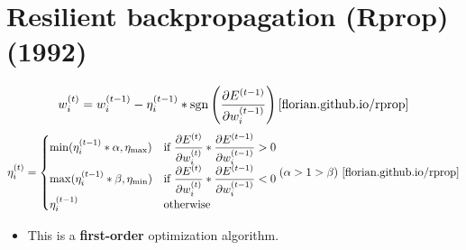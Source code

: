 \section{Resilient backpropagation (Rprop) (1992) \cite{wiki-Rprop,pytorch-Rprop,florian.github.io/rprop}}\label{Resilient backpropagation (Rprop)}

\[
    \displaystyle w_i^{(t)} = w_i^{(t - 1)} - \eta_i^{(t - 1)} * \operatorname{sgn}\left(\frac{\partial E^{(t -
    1)}}{\partial w_i^{(t - 1)}}\right)
    \hfill
    \text{\cite{florian.github.io/rprop}}
\]
\[
    \displaystyle \eta_i^{(t)} = \begin{cases}
    \min(\eta_i^{(t - 1)} * \alpha, \eta_{\max}) & \text{if } \displaystyle\frac{\partial E^{(t)}}{\partial w_i^{(t)}} * \displaystyle\frac{\partial E^{(t - 1)}}{\partial w_i^{(t - 1)}} > 0 \\
    \max(\eta_i^{(t - 1)} * \beta, \eta_{\min}) & \text{if } \displaystyle\frac{\partial E^{(t)}}{\partial w_i^{(t)}} * \displaystyle\frac{\partial E^{(t - 1)}}{\partial w_i^{(t - 1)}} < 0 \\
    \eta_i^{(t - 1)} & \text{otherwise}
    \end{cases}
    \hfill
    (\alpha > 1 > \beta) \text{ \cite{florian.github.io/rprop}}
\]


\begin{itemize}
    \item This is a \textbf{first-order} optimization algorithm.
\end{itemize}

